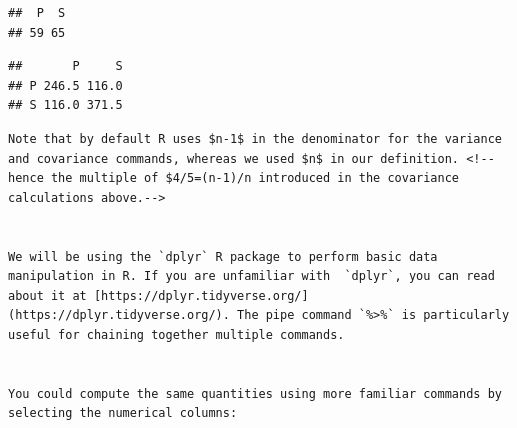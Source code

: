 \documentclass[]{book}
\newenvironment{Shaded}{\begin{snugshade}}{\end{snugshade}}
\newcommand{\DataTypeTok}[1]{\textcolor[rgb]{0.13,0.29,0.53}{#1}}
\newcommand{\DecValTok}[1]{\textcolor[rgb]{0.00,0.00,0.81}{#1}}
\newcommand{\KeywordTok}[1]{\textcolor[rgb]{0.13,0.29,0.53}{\textbf{#1}}}
\newcommand{\NormalTok}[1]{#1}
\newcommand{\OperatorTok}[1]{\textcolor[rgb]{0.81,0.36,0.00}{\textbf{#1}}}
\newcommand{\StringTok}[1]{\textcolor[rgb]{0.31,0.60,0.02}{#1}}
\theoremstyle{definition}
\theoremstyle{definition}
\theoremstyle{definition}
\theoremstyle{remark}
\begin{document}
\begin{Shaded}
\end{Shaded}

\begin{verbatim}
##  P  S 
## 59 65
\end{verbatim}

\begin{Shaded}
\end{Shaded}

\begin{verbatim}
##       P     S
## P 246.5 116.0
## S 116.0 371.5
\end{verbatim}

\begin{verbatim}
Note that by default R uses $n-1$ in the denominator for the variance and covariance commands, whereas we used $n$ in our definition. <!-- hence the multiple of $4/5=(n-1)/n introduced in the covariance calculations above.-->


We will be using the `dplyr` R package to perform basic data manipulation in R. If you are unfamiliar with  `dplyr`, you can read about it at [https://dplyr.tidyverse.org/](https://dplyr.tidyverse.org/). The pipe command `%>%` is particularly useful for chaining together multiple commands.


You could compute the same quantities using more familiar commands by selecting the numerical columns:
 
\end{verbatim}
\end{document}
